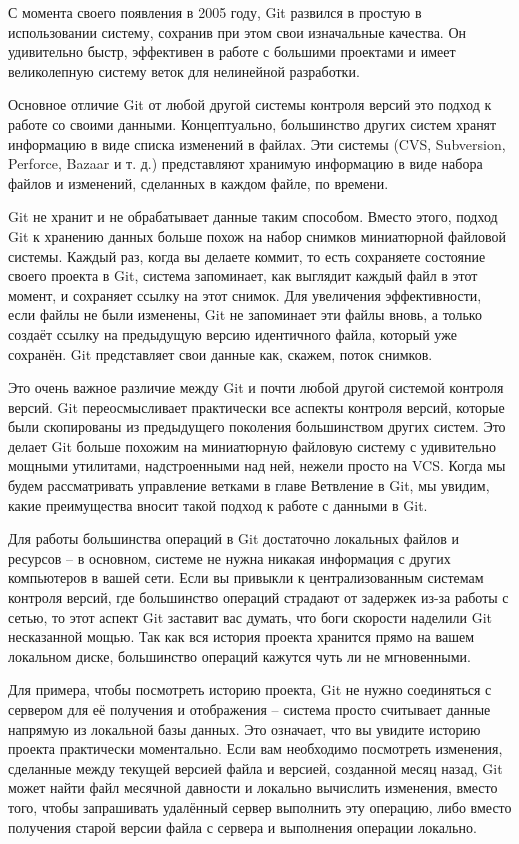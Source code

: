 С момента своего появления в 2005 году, Git развился в простую в использовании систему, сохранив при этом свои изначальные качества. Он удивительно быстр, эффективен в работе с большими проектами и имеет великолепную систему веток для нелинейной разработки.

Основное отличие Git от любой другой системы контроля версий это подход к работе со своими данными. Концептуально, большинство других
систем хранят информацию в виде списка изменений в файлах. Эти системы (CVS,
Subversion, Perforce, Bazaar и т. д.) представляют хранимую информацию в виде набора файлов и изменений, сделанных в каждом файле, по времени.

Git не хранит и не обрабатывает данные таким способом. Вместо этого, подход Git к хранению данных больше похож на набор снимков миниатюрной файловой системы. Каждый раз, когда вы делаете коммит, то есть сохраняете состояние своего проекта в Git, система запоминает, как выглядит каждый файл в этот момент, и сохраняет ссылку на этот снимок. Для увеличения эффективности, если файлы не были изменены, Git не запоминает эти файлы вновь, а только создаёт ссылку на предыдущую версию идентичного файла, который уже сохранён. Git представляет свои данные как, скажем, поток снимков.

Это очень важное различие между Git и почти любой другой системой контроля версий. Git переосмысливает практически все аспекты контроля версий, которые были скопированы из предыдущего поколения большинством других систем. Это делает Git больше похожим на миниатюрную файловую систему с удивительно мощными утилитами, надстроенными над ней, нежели просто на VCS. Когда мы будем рассматривать управление ветками в главе Ветвление в Git, мы увидим, какие преимущества вносит такой подход к работе с данными в Git.

Для работы большинства операций в Git достаточно локальных файлов и ресурсов --  в основном, системе не нужна никакая информация с других компьютеров в вашей сети. Если вы привыкли к централизованным системам контроля версий, где большинство операций страдают от задержек из-за работы с сетью, то этот аспект Git заставит вас думать, что боги скорости наделили Git несказанной мощью. Так как вся история проекта хранится прямо на вашем локальном диске, большинство операций кажутся чуть ли не мгновенными.

Для примера, чтобы посмотреть историю проекта, Git не нужно соединяться с сервером для её получения и отображения -- система просто считывает данные напрямую из локальной базы данных. Это означает, что вы увидите историю проекта практически моментально. Если вам необходимо посмотреть изменения, сделанные между текущей версией файла и версией, созданной месяц назад, Git может найти файл месячной давности и локально вычислить изменения, вместо того, чтобы запрашивать удалённый сервер выполнить эту операцию, либо вместо получения старой версии файла с сервера и выполнения операции локально.

